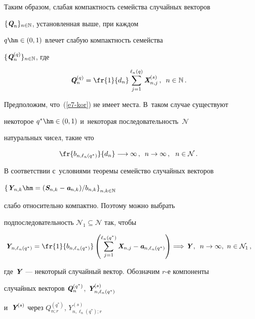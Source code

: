 Таким образом, слабая компактность семейства случайных векторов


$\{\emph{\textbf{Q}}_n\}_{n\in\mathbb{N}}$, установленная выше, при каждом


$q\hm\in(0,1)$ влечет слабую компактность семейства


$\{\emph{\textbf{Q}}_n^{(q)}\}_{n\in\mathbb{N}}$, где


$$


\vQ_n^{(q)}=\fr{1}{d_n}\sum\limits_{j=1}^{\ell_n(q)}\vX_{n,j}^{(s)}\,,\enskip


n\in\mathbb{N}\,.


$$


Предположим, что~(\ref{e7-kor}) не имеет места. В~таком случае существуют


некоторое $q^*\hm\in(0,1)$ и~некоторая последовательность~$\mathcal{N}$


натуральных чисел, такие что


\begin{equation}


\fr{b_{n,\ell_n(q^*)}}{d_n}\longrightarrow \infty\,,\enskip


n\to\infty\,,\ \ n\in\mathcal{N}\,.\label{e8-kor}


\end{equation}


В соответствии с~условиями теоремы семейство случайных векторов


$\left\{\vY_{n,k}\hm=(\vS_{n,k}-\va_{n,k})/b_{n,k}\right\}_{n,k\in\mathbb{N}}$


слабо относительно компактно. Поэтому можно выбрать


подпоследовательность $\mathcal{N}_1\subseteq\mathcal{N}$ так, чтобы


\begin{equation}


\vY_{n,\ell_n(q^*)}=\fr{1}{b_{n,\ell_n(q^*)}}\left(


\sum\limits_{j=1}^{\ell_n(q^*)}\vX_{n,j}-\va_{n,\ell_n(q^*)}\right)\Longrightarrow


\vY\,,\enskip n\to\infty,\ n\in\mathcal{N}_1\,,\label{e9-kor}


\end{equation}


где $\emph{\textbf{Y}}$~--- некоторый случайный вектор. Обозначим $r$-е компоненты


случайных векторов $\emph{\textbf{Q}}_n^{(q^*)}$, $\emph{\textbf{Y}}_{n,\ell_n(q^*)}^{(s)}$


и~$\emph{\textbf{Y}}^{(s)}$ через $Q_{n;r}^{(q^*)}$, $Y_{n,\ell_n(q^*);r}^{(s)}$


